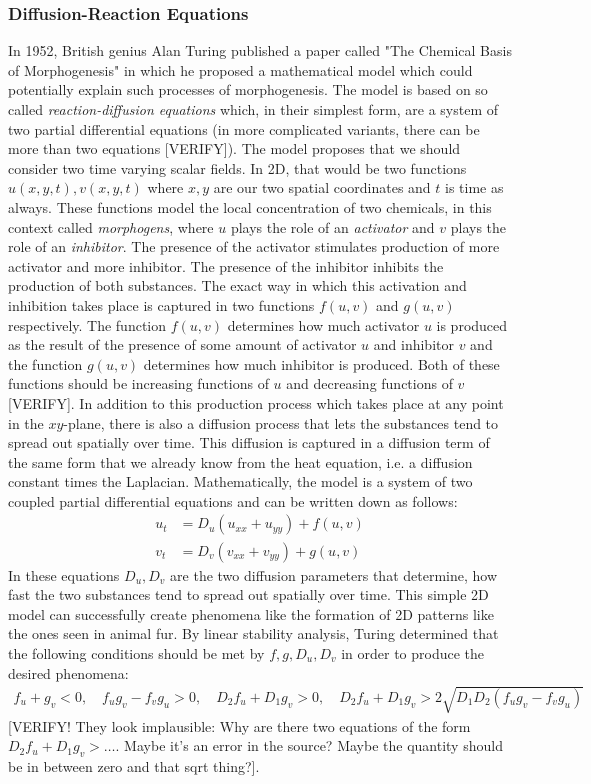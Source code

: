 \subsubsection{Diffusion-Reaction Equations} In 1952, British genius Alan Turing published a paper called "The Chemical Basis of Morphogenesis" in which he proposed a mathematical model which could potentially explain such processes of morphogenesis. The model is based on so called \emph{reaction-diffusion equations} which, in their simplest form, are a system of two partial differential equations (in more complicated variants, there can be more than two equations [VERIFY]). The model proposes that we should consider two time varying scalar fields. In 2D, that would be two functions $u(x,y,t), v(x,y,t)$ where $x,y$ are our two spatial coordinates and $t$ is time as always. These functions model the local concentration of two chemicals, in this context called \emph{morphogens}, where $u$ plays the role of an \emph{activator} and $v$ plays the role of an \emph{inhibitor}. The presence of the activator stimulates production of more activator and more inhibitor. The presence of the inhibitor inhibits the production of both substances. The exact way in which this activation and inhibition takes place is captured in two functions $f(u,v)$ and $g(u,v)$ respectively. The function $f(u,v)$ determines how much activator $u$ is produced as the result of the presence of some amount of activator $u$ and inhibitor $v$ and the function $g(u,v)$ determines how much inhibitor is produced. Both of these functions should be increasing functions of $u$ and decreasing functions of $v$ [VERIFY]. In addition to this production process which takes place at any point in the $xy$-plane, there is also a diffusion process that lets the substances tend to spread out spatially over time. This diffusion is captured in a diffusion term of the same form that we already know from the heat equation, i.e. a diffusion constant times the Laplacian. Mathematically, the model is a system of two coupled partial differential equations and can be written down as follows:
\begin{eqnarray}
u_t &= D_u (u_{xx} + u_{yy}) + f(u,v)  \\
v_t &= D_v (v_{xx} + v_{yy}) + g(u,v) 
\end{eqnarray}
In these equations $D_u, D_v$ are the two diffusion parameters that determine, how fast the two substances tend to spread out spatially over time. This simple 2D model can successfully create phenomena like the formation of 2D patterns like the ones seen in animal fur. By linear stability analysis, Turing determined that the following conditions should be met by $f, g, D_u, D_v$ in order to produce the desired phenomena:
\begin{eqnarray}
 f_u + g_v < 0, \quad 
 f_u g_v - f_v g_u > 0, \quad
 D_2 f_u + D_1 g_v > 0, \quad
 D_2 f_u + D_1 g_v > 2 \sqrt{D_1 D_2 (f_u g_v - f_v g_u)}
\end{eqnarray}
[VERIFY! They look implausible: Why are there two equations of the form $D_2 f_u + D_1 g_v > \ldots$. Maybe it's an error in the source? Maybe the quantity should be in between zero and that sqrt thing?].

